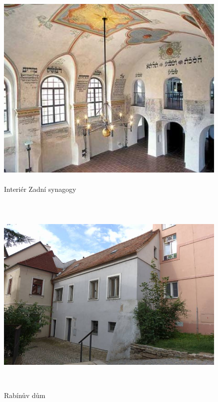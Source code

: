 \documentclass[a4paper,oneside,12pt]{report}
\begin{document}
\begin{figure}
	\centering
	\includegraphics[height=10cm]{../img/zadniSynagogaInterier}
	\caption[Zadní synagoga \text{[online]} Czech tourism. Dostupné z: \url{https://www.czechtourism.com/c/trebic-rear-synagogue/} \text{[cit. 2020-03-27]}]{
		Interiér Zadní synagogy
	}
	\label{fig:zsi}
\end{figure}

\begin{figure}
	\centering
	\includegraphics[height=10cm]{../img/rabinuvDumBudova.jpg}
	\caption[Rabínův dům \text{[online]} NPÚ památkový katalog. Dostupné z: \url{https://www.pamatkovykatalog.cz/rabinsky-dum-22238373} \text{[cit. 2020-03-28]}]{
		Rabínův dům
	}
	\label{fig:rdb}
\end{figure}
\end{document}
